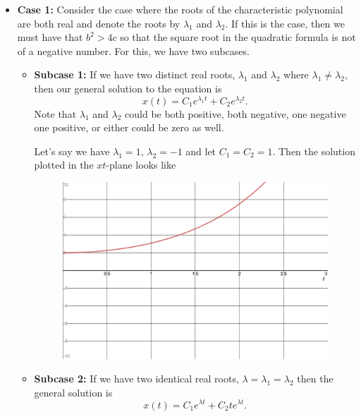         \begin{itemize}
            \item \textbf{Case 1:} Consider the case where the roots of the characteristic polynomial are both real and denote the roots by $\lambda_1$ and $\lambda_2$.  If this is the case, then we must have that $b^2>4c$ so that the square root in the quadratic formula is not of a negative number. For this, we have two subcases.
            \begin{itemize}
                \item \textbf{Subcase 1:} If we have two distinct real roots, $\lambda_1$ and $\lambda_2$ where $\lambda_1\neq \lambda_2$, then our general solution to the equation is
                \[
                x(t)=C_1e^{\lambda_1 t}+C_2e^{\lambda_2 t}.
                \]
                Note that $\lambda_1$ and $\lambda_2$ could be both positive, both negative, one negative one positive, or either could be zero as well.
                
                Let's say we have $\lambda_1=1$, $\lambda_2=-1$ and let $C_1=C_2=1$. Then the solution plotted in the $xt$-plane looks like
                \begin{figure}[H]
                    \centering
                    \includegraphics[width=.7\textwidth]{Figures_Part_2/l1=1_l2=-1.png}
                \end{figure}
                \item \textbf{Subcase 2:} If we have two identical real roots, $\lambda=\lambda_1=\lambda_2$ then the general solution is
                \[
                x(t)=C_1 e^{\lambda t}+C_2te^{\lambda t}.
                \]
                

\end{itemize}
\end{itemize}

